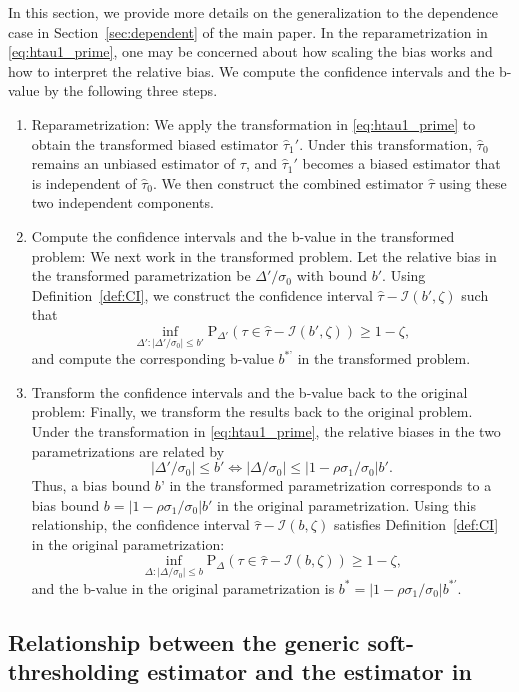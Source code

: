 \documentclass[11pt]{article}
\def\P{{\mathrm P}}
\def\cI{{\mathcal I}}
\newcommand{\htau}{\widehat\tau}
\numberwithin{equation}{section}
\theoremstyle{definition}
\begin{document}
In this section, we provide more details on the generalization to the dependence case in Section~\ref{sec:dependent} of the main paper. In the reparametrization in \eqref{eq:htau1_prime}, one may be concerned about how scaling the bias works and how to interpret the relative bias. We compute the confidence intervals and the b-value by the following three steps.

\begin{enumerate}[label=(\alph*)]
  \item Reparametrization: We apply the transformation in \eqref{eq:htau1_prime} to obtain the transformed biased estimator $\htau_1'$. Under this transformation, $\hat\tau_0$ remains an unbiased estimator of $\tau$, and $\hat\tau_1'$ becomes a biased estimator that is independent of $\hat\tau_0$. We then construct the combined estimator $\hat\tau$ using these two independent components.
  \item Compute the confidence intervals and the b-value in the transformed problem: We next work in the transformed problem. Let the relative bias in the transformed parametrization be $\Delta'/\sigma_0$ with bound $b'$. Using Definition~\ref{def:CI}, we construct the confidence interval $\htau - \cI(b', \zeta)$ such that
  \[
    \inf_{\Delta': \lvert \Delta'/\sigma_0 \rvert \le b'} \P_{\Delta'}(\tau \in \htau - \cI(b', \zeta)) \ge 1 - \zeta,
  \]
  and compute the corresponding b-value $b^{*’}$ in the transformed problem.
  \item Transform the confidence intervals and the b-value back to the original problem: Finally, we transform the results back to the original problem. Under the transformation in \eqref{eq:htau1_prime}, the relative biases in the two parametrizations are related by
  \[
    \lvert \Delta'/\sigma_0 \rvert \le b' \iff \lvert \Delta/\sigma_0 \rvert \le \lvert 1 - \rho \sigma_1/\sigma_0 \rvert b'.
  \]
  Thus, a bias bound $b’$ in the transformed parametrization corresponds to a bias bound $b = \lvert 1 - \rho \sigma_1/\sigma_0 \rvert b'$ in the original parametrization. Using this relationship, the confidence interval $\htau - \cI(b, \zeta)$ satisfies Definition~\ref{def:CI} in the original parametrization:
  \[
    \inf_{\Delta: \lvert \Delta/\sigma_0 \rvert \le b} \P_{\Delta}(\tau \in \htau - \cI(b, \zeta)) \ge 1 - \zeta,
  \]
  and the b-value in the original parametrization is $b^* = \lvert 1 - \rho \sigma_1/\sigma_0 \rvert b^{*'}$.
\end{enumerate}

\subsection{Relationship between the generic soft-thresholding estimator and the estimator in \citet{j1981estimation, bickel1984parametric}}\label{sec:efron--morris}
\end{document}
